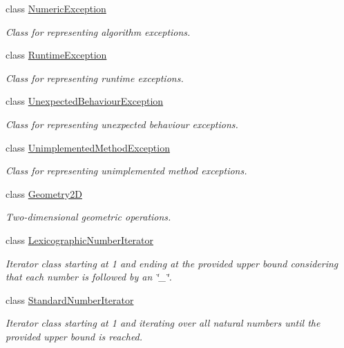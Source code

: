 \begin{DoxyCompactItemize}
class \hyperlink{classmultiscale_1_1NumericException}{\-Numeric\-Exception}
\begin{DoxyCompactList}\small\item\em \-Class for representing algorithm exceptions. \end{DoxyCompactList}\item 
class \hyperlink{classmultiscale_1_1RuntimeException}{\-Runtime\-Exception}
\begin{DoxyCompactList}\small\item\em \-Class for representing runtime exceptions. \end{DoxyCompactList}\item 
class \hyperlink{classmultiscale_1_1UnexpectedBehaviourException}{\-Unexpected\-Behaviour\-Exception}
\begin{DoxyCompactList}\small\item\em \-Class for representing unexpected behaviour exceptions. \end{DoxyCompactList}\item 
class \hyperlink{classmultiscale_1_1UnimplementedMethodException}{\-Unimplemented\-Method\-Exception}
\begin{DoxyCompactList}\small\item\em \-Class for representing unimplemented method exceptions. \end{DoxyCompactList}\item 
class \hyperlink{classmultiscale_1_1Geometry2D}{\-Geometry2\-D}
\begin{DoxyCompactList}\small\item\em \-Two-\/dimensional geometric operations. \end{DoxyCompactList}\item 
class \hyperlink{classmultiscale_1_1LexicographicNumberIterator}{\-Lexicographic\-Number\-Iterator}
\begin{DoxyCompactList}\small\item\em \-Iterator class starting at 1 and ending at the provided upper bound considering that each number is followed by an \char`\"{}\-\_\-\char`\"{}. \end{DoxyCompactList}\item 
class \hyperlink{classmultiscale_1_1StandardNumberIterator}{\-Standard\-Number\-Iterator}
\begin{DoxyCompactList}\small\item\em \-Iterator class starting at 1 and iterating over all natural numbers until the provided upper bound is reached. \end{DoxyCompactList}\item 

\end{DoxyCompactItemize}
